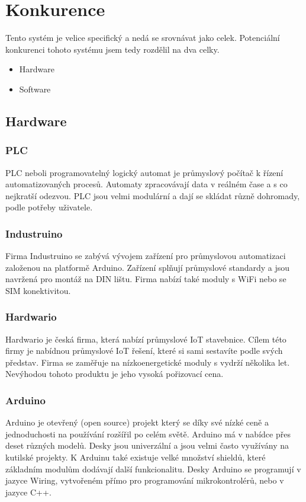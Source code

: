 \chapter{Konkurence}
Tento systém je velice specifický a nedá se srovnávat jako celek. 
Potenciální konkurenci tohoto systému jsem tedy rozdělil na dva celky.

\begin{itemize} %
    \item Hardware
    \item Software
\end{itemize}



\section{Hardware}

\fxnote[author=JA]{\textcolor{mygreen}{Přidat obrázky}}

\subsection{PLC}
PLC neboli programovatelný logický automat je průmyslový počítač k řízení automatizovaných procesů.
Automaty zpracovávají data v reálném čase a s co nejkratší odezvou.
PLC jsou velmi modulární a dají se skládat různě dohromady, podle potřeby uživatele.


\subsection{Industruino}
Firma Industruino\cite{INDUSTRINO} se zabývá vývojem zařízení pro průmyslovou automatizaci založenou na platformě Arduino.
Zařízení splňují průmyslové standardy a jsou navržená pro montáž na  DIN lištu. Firma nabízí také moduly s WiFi nebo se SIM konektivitou.


\subsection{Hardwario}
Hardwario\cite{HARDWARIO} je česká firma, která nabízí průmyslové IoT stavebnice.
Cílem této firmy je nabídnou průmyslové IoT řešení, které si sami sestavíte podle svých představ.
Firma se zaměřuje na nízkoenergetické moduly s vydrží několika let.
Nevýhodou tohoto produktu je jeho vysoká pořizovací cena. 
\fxnote[author=JA]{\textcolor{mygreen}{Cena???}}


\subsection{Arduino}
Arduino \cite{ARDUGREENHOUSE} je otevřený (open source) projekt který se díky své nízké ceně a jednoduchosti na používání rozšířil po celém světě.
Arduino má v nabídce přes deset různých modelů. Desky jsou univerzální a jsou velmi často využívány na kutilské projekty.
K Arduinu také existuje velké množství shieldů, které základním modulům dodávají další funkcionalitu. 
Desky Arduino se programují v jazyce Wiring, vytvořeném přímo pro programování mikrokontrolérů, nebo v jazyce C++. 




